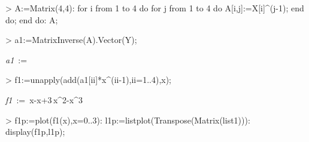 \begin{MapleInput}
> A:=Matrix(4,4): 
  for i from 1 to 4 do 
    for j from 1 to 4 do 
      A[i,j]:=X[i]^(j-1);
    end do; 
  end do:
  A;
\end{MapleInput}
\begin{MapleOutput}
\end{MapleOutput}

\begin{MapleInput}
> a1:=MatrixInverse(A).Vector(Y);
\end{MapleInput}
\begin{MapleOutput}
{\it a1}\, := \, \left[ \begin {array}{c} 1\\ -1\\ 3\\ -1\end {array} \right]
\end{MapleOutput}
\begin{MapleInput}
> f1:=unapply(add(a1[ii]*x^(ii-1),ii=1..4),x);
\end{MapleInput}
\begin{MapleOutput}
{\it f1}\, := \,x-x+3\,{x}^{2}-{x}^{3}
\end{MapleOutput}
\begin{MapleInput}
> f1p:=plot(f1(x),x=0..3): 
  l1p:=listplot(Transpose(Matrix(list1))):
  display(f1p,l1p);
\end{MapleInput}
